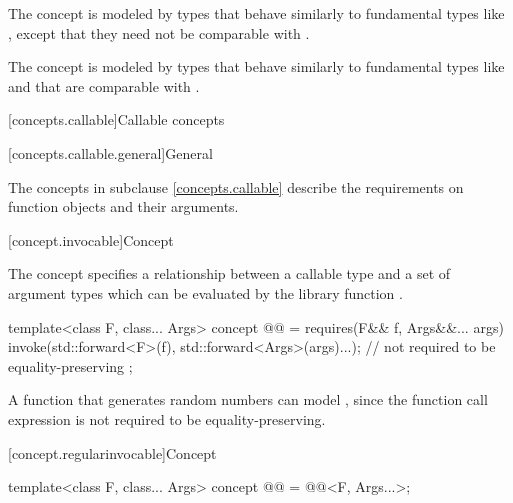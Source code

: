 \begin{itemdescr}
\pnum
\begin{note}
The  concept is modeled by types that behave similarly
to fundamental types like , except that they need not
be comparable with \tcode{==}.
\end{note}

\pnum
\begin{note}
The  concept is modeled by types that behave similarly to
fundamental types like  and that are comparable with
\tcode{==}.
\end{note}
\end{itemdescr}

[concepts.callable]{Callable concepts}

[concepts.callable.general]{General}

\pnum
The concepts in subclause \ref{concepts.callable} describe the requirements on function
objects and their arguments.

[concept.invocable]{Concept }

\pnum
The  concept specifies a relationship between a callable
type  and a set of argument types  which
can be evaluated by the library function .

\begin{itemdecl}
template<class F, class... Args>
  concept @@ = requires(F&& f, Args&&... args) {
    invoke(std::forward<F>(f), std::forward<Args>(args)...); // not required to be equality-preserving
  };
\end{itemdecl}

\begin{itemdescr}
\pnum
\begin{example}
A function that generates random numbers can model ,
since the  function call expression is not required to be
equality-preserving.
\end{example}
\end{itemdescr}

[concept.regularinvocable]{Concept }

\begin{itemdecl}
template<class F, class... Args>
  concept @@ = @@<F, Args...>;
\end{itemdecl}

